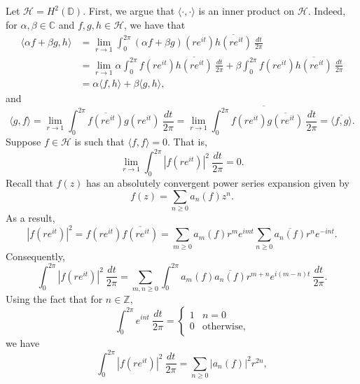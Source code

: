 \documentclass[10pt]{amsart}
\theoremstyle{thmstyle}
\theoremstyle{defstyle}
\newcommand{\Z}{\mathbb{Z}}
\newcommand{\bbC}{\mathbb{C}}
\newcommand{\calH}{\mathcal{H}} %
\renewcommand{\ge}{\geqslant}
\begin{document}
Let $\calH = H^2(\mathbb D)$. First, we argue that $\langle\cdot,\cdot\rangle$ is an inner product on $\calH$. Indeed, for $\alpha,\beta\in\bbC$ and $f,g, h\in\calH$, we have that 
\begin{align*}
    \langle\alpha f + \beta g, h\rangle &= \lim_{r\to 1}\int_{0}^{2\pi}(\alpha f + \beta g)(re^{it})\overline{h(re^{it})}~\frac{dt}{2\pi}\\
    &= \lim_{r\to 1}\alpha\int_{0}^{2\pi}f(re^{it})\overline{h(re^{it})}~\frac{dt}{2\pi} + \beta\int_{0}^{2\pi}f(re^{it})\overline{h(re^{it})}~\frac{dt}{2\pi}\\
    &=\alpha\langle f, h\rangle + \beta\langle g, h\rangle,
\end{align*}
and 
\begin{equation*}
    \langle g, f\rangle = \lim_{r\to 1}\int_{0}^{2\pi}\overline{f(re^{it})}g(re^{it})~\frac{dt}{2\pi} = \lim_{r\to 1}\overline{\int_{0}^{2\pi}f(re^{it})\overline{g(re^{it})}~\frac{dt}{2\pi}} = \overline{\langle f, g\rangle}.
\end{equation*}
Suppose $f\in\calH$ is such that $\langle f, f\rangle = 0$. That is,
\begin{equation*}
    \lim_{r\to 1}\int_0^{2\pi}|f(re^{it})|^2~\frac{dt}{2\pi} = 0.
\end{equation*}
Recall that $f(z)$ has an absolutely convergent power series expansion given by 
\begin{equation*}
    f(z) = \sum_{n\ge 0}a_n(f)z^n.
\end{equation*}
As a result, 
\begin{equation*}
    |f(re^{it})|^2 = f(re^{it})\overline{f(re^{it})} = \sum_{m\ge 0} a_m(f)r^me^{imt}\sum_{n\ge 0}\overline{a_n(f)}r^ne^{-int}.
\end{equation*}
Consequently, 
\begin{equation*}
    \int_{0}^{2\pi}|f(re^{it})|^2~\frac{dt}{2\pi} = \sum_{m,n\ge 0}\int_0^{2\pi}a_m(f)\overline{a_n(f)}r^{m + n}e^{i(m - n)t}~\frac{dt}{2\pi}.
\end{equation*}
Using the fact that for $n\in\Z$, 
\begin{equation*}
    \int_0^{2\pi}e^{int}~\frac{dt}{2\pi} = 
    \begin{cases}
        1 & n = 0\\
        0 & \text{otherwise},
    \end{cases}
\end{equation*}
we have 
\begin{equation*}
    \int_0^{2\pi}|f(re^{it})|^2~\frac{dt}{2\pi} = \sum_{n\ge 0}|a_n(f)|^2r^{2n},
\end{equation*}
\end{document}
